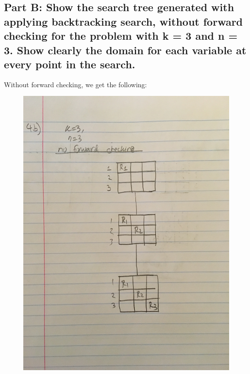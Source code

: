 \documentclass[paper=a4, fontsize=11pt]{scrartcl} %
\numberwithin{equation}{section} %
\numberwithin{figure}{section} %
\numberwithin{table}{section} %
\begin{document}
\subsection{Part B: Show the search tree generated with applying backtracking search, without forward checking for the problem
with k = 3 and n = 3. Show clearly the domain for each variable at every point in the search.}
Without forward checking, we get the following:
\begin{figure}[H]
    \includegraphics[width=\linewidth]{nofwd.JPG}
\end{figure}
\end{document}
